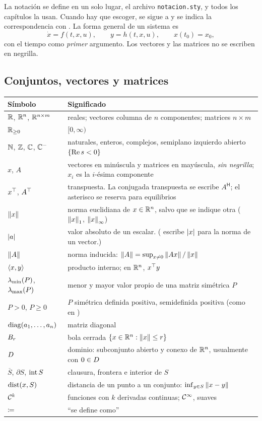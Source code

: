 La notación se define en un solo lugar, el archivo \texttt{notacion.sty}, y todos los capítulos la usan. Cuando hay que escoger, se sigue a \citet{Kha02} y se indica la correspondencia con \citet{KeBr23}. La forma general de un sistema es
\[
\dot x=f(t,x,u),\qquad y=h(t,x,u),\qquad x(t_0)=x_0,
\]
con el tiempo como \emph{primer} argumento. Los vectores y las matrices no se escriben en negrilla.

\subsection*{Conjuntos, vectores y matrices}


\small
\begin{tabular}{@{}>{\raggedright\arraybackslash}p{3.0cm}>{\raggedright\arraybackslash}p{9.5cm}@{}}
\toprule
Símbolo & Significado \\
\midrule
$\mathbb{R}$, $\mathbb{R}^n$, $\mathbb{R}^{n\times m}$ & reales; vectores columna de $n$ componentes; matrices $n\times m$ \\
$\mathbb{R}_{\ge 0}$ & $[0,\infty)$ \\
$\mathbb{N}$, $\mathbb{Z}$, $\mathbb{C}$, $\mathbb{C}^{-}$ & naturales, enteros, complejos, semiplano izquierdo abierto $\{\operatorname{Re} s<0\}$ \\
$x$, $A$ & vectores en minúscula y matrices en mayúscula, \emph{sin negrilla}; $x_i$ es la $i$-ésima componente \\
$x^{\top}$, $A^{\top}$ & transpuesta. La conjugada transpuesta se escribe $A^{\mathsf H}$; el asterisco se reserva para equilibrios \\
$\left\lVert x\right\rVert$ & norma euclidiana de $x\in\mathbb{R}^n$, salvo que se indique otra ($\left\lVert x\right\rVert_1$, $\left\lVert x\right\rVert_\infty$) \\
$\left\lvert a\right\rvert$ & valor absoluto de un escalar. (\citet{KeBr23} escribe $\left\lvert x\right\rvert$ para la norma de un vector.) \\
$\left\lVert A\right\rVert$ & norma inducida: $\left\lVert A\right\rVert=\sup_{x\neq0}\left\lVert Ax\right\rVert/\left\lVert x\right\rVert$ \\
$\left\langle x,y\right\rangle$ & producto interno; en $\mathbb{R}^n$, $x^{\top} y$ \\
$\lambda_{\min}(P)$, $\lambda_{\max}(P)$ & menor y mayor valor propio de una matriz simétrica $P$ \\
$P>0$, $P\ge0$ & $P$ simétrica definida positiva, semidefinida positiva (como en \citet{Kha02}) \\
$\operatorname{diag}(a_1,\dots,a_n)$ & matriz diagonal \\
$B_{r}$ & bola cerrada $\{x\in\mathbb{R}^n:\left\lVert x\right\rVert\le r\}$ \\
$D$ & dominio: subconjunto abierto y conexo de $\mathbb{R}^n$, usualmente con $0\in D$ \\
$\overline S$, $\partial S$, $\operatorname{int} S$ & clausura, frontera e interior de $S$ \\
$\operatorname{dist}(x,S)$ & distancia de un punto a un conjunto: $\inf_{y\in S}\left\lVert x-y\right\rVert$ \\
$\mathcal{C}^{k}$ & funciones con $k$ derivadas continuas; $\mathcal{C}^{\infty}$, suaves \\
$\coloneqq$ & ``se define como'' \\
\bottomrule
\end{tabular}


